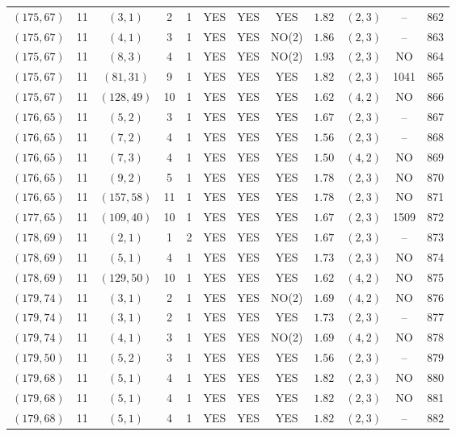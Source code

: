 \begin{longtable}{|c|c|c|c|c|c|c|c|c|c|c|c|}
$(175,67)$ & 11 & $(3,1)$ & 2 & 1 & YES & YES & YES & $1.82$ & $(2,3)$ & -- & 862\\
$(175,67)$ & 11 & $(4,1)$ & 3 & 1 & YES & YES & NO(2) & $1.86$ & $(2,3)$ & -- & 863\\
$(175,67)$ & 11 & $(8,3)$ & 4 & 1 & YES & YES & NO(2) & $1.93$ & $(2,3)$ & NO & 864\\
$(175,67)$ & 11 & $(81,31)$ & 9 & 1 & YES & YES & YES & $1.82$ & $(2,3)$ & 1041 & 865\\
$(175,67)$ & 11 & $(128,49)$ & 10 & 1 & YES & YES & YES & $1.62$ & $(4,2)$ & NO & 866\\
$(176,65)$ & 11 & $(5,2)$ & 3 & 1 & YES & YES & YES & $1.67$ & $(2,3)$ & -- & 867\\
$(176,65)$ & 11 & $(7,2)$ & 4 & 1 & YES & YES & YES & $1.56$ & $(2,3)$ & -- & 868\\
$(176,65)$ & 11 & $(7,3)$ & 4 & 1 & YES & YES & YES & $1.50$ & $(4,2)$ & NO & 869\\
$(176,65)$ & 11 & $(9,2)$ & 5 & 1 & YES & YES & YES & $1.78$ & $(2,3)$ & NO & 870\\
$(176,65)$ & 11 & $(157,58)$ & 11 & 1 & YES & YES & YES & $1.78$ & $(2,3)$ & NO & 871\\
$(177,65)$ & 11 & $(109,40)$ & 10 & 1 & YES & YES & YES & $1.67$ & $(2,3)$ & 1509 & 872\\
$(178,69)$ & 11 & $(2,1)$ & 1 & 2 & YES & YES & YES & $1.67$ & $(2,3)$ & -- & 873\\
$(178,69)$ & 11 & $(5,1)$ & 4 & 1 & YES & YES & YES & $1.73$ & $(2,3)$ & NO & 874\\
$(178,69)$ & 11 & $(129,50)$ & 10 & 1 & YES & YES & YES & $1.62$ & $(4,2)$ & NO & 875\\
$(179,74)$ & 11 & $(3,1)$ & 2 & 1 & YES & YES & NO(2) & $1.69$ & $(4,2)$ & NO & 876\\
$(179,74)$ & 11 & $(3,1)$ & 2 & 1 & YES & YES & YES & $1.73$ & $(2,3)$ & -- & 877\\
$(179,74)$ & 11 & $(4,1)$ & 3 & 1 & YES & YES & NO(2) & $1.69$ & $(4,2)$ & NO & 878\\
$(179,50)$ & 11 & $(5,2)$ & 3 & 1 & YES & YES & YES & $1.56$ & $(2,3)$ & -- & 879\\
$(179,68)$ & 11 & $(5,1)$ & 4 & 1 & YES & YES & YES & $1.82$ & $(2,3)$ & NO & 880\\
$(179,68)$ & 11 & $(5,1)$ & 4 & 1 & YES & YES & YES & $1.82$ & $(2,3)$ & NO & 881\\
$(179,68)$ & 11 & $(5,1)$ & 4 & 1 & YES & YES & YES & $1.82$ & $(2,3)$ & -- & 882\\

\end{longtable}
